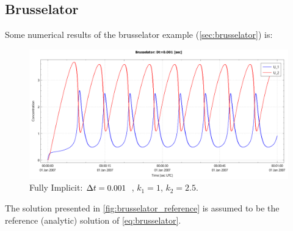 \subsection{Brusselator}
Some numerical results of the brusselator example (\autoref{sec:brusselator}) is:
\begin{figure}[H]
    \includegraphics[width=\textwidth]{figures/brusselator_imp_dt=0d001.pdf}
    \caption[Brusselator experiment: $\Dt = 0.001\ \bunit{\second}$]{Fully Implicit: $\Delta t=0.001$\ \bunit{\second}, $k_1=1$, $k_2=2.5$. }\label{fig:brusselator_reference}
\end{figure}
The solution presented in \autoref{fig:brusselator_reference} is assumed to be the reference (analytic) solution of \autoref{eq:brusselator}.
%
